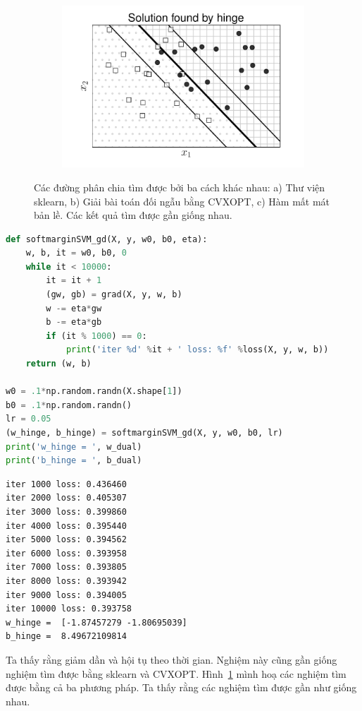 \begin{figure}[t]
\begin{subfigure}{0.325\textwidth}
    \includegraphics[width=\linewidth]{ebookML_src/src/softmargin_svm/svm_hinge.pdf}
    \caption{}
    \end{subfigure}

    \caption{Các đường phân chia tìm được bởi ba cách khác nhau: a) Thư viện
    sklearn, b) Giải bài toán đối ngẫu bằng CVXOPT, c) Hàm mất mát bản lề. Các kết
    quả tìm được gần giống nhau.}
    \label{fig:20_5}
\end{figure}

\begin{lstlisting}[language=Python]
def softmarginSVM_gd(X, y, w0, b0, eta):
    w, b, it = w0, b0, 0     
    while it < 10000:
        it = it + 1
        (gw, gb) = grad(X, y, w, b)
        w -= eta*gw
        b -= eta*gb
        if (it % 1000) == 0:
            print('iter %d' %it + ' loss: %f' %loss(X, y, w, b))
    return (w, b)

w0 = .1*np.random.randn(X.shape[1]) 
b0 = .1*np.random.randn()
lr = 0.05
(w_hinge, b_hinge) = softmarginSVM_gd(X, y, w0, b0, lr)
print('w_hinge = ', w_dual)
print('b_hinge = ', b_dual)
\end{lstlisting}
\kq 
\begin{lstlisting}
iter 1000 loss: 0.436460
iter 2000 loss: 0.405307
iter 3000 loss: 0.399860
iter 4000 loss: 0.395440
iter 5000 loss: 0.394562
iter 6000 loss: 0.393958
iter 7000 loss: 0.393805
iter 8000 loss: 0.393942
iter 9000 loss: 0.394005
iter 10000 loss: 0.393758
w_hinge =  [-1.87457279 -1.80695039]
b_hinge =  8.49672109814
\end{lstlisting}
Ta thấy rằng  giảm dần và hội tụ theo thời gian. Nghiệm này cũng gần giống nghiệm tìm được bằng sklearn và CVXOPT. 
Hình~\ref{fig:20_5} mình hoạ các nghiệm tìm được bằng cả ba phương pháp.
Ta thấy rằng các nghiệm tìm được gần như giống nhau. 

